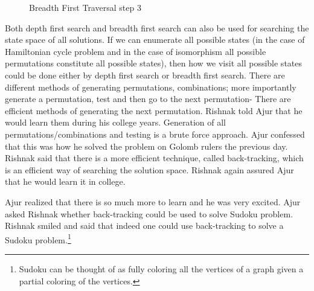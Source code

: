 \begin{figure}
\begin{center}
\caption{ Breadth First Traversal step 3}\label{20g10}
\end{center}
\end{figure}

Both depth first search and breadth first search can also be used for searching the state space of all solutions. If we can enumerate all possible states (in the case of Hamiltonian cycle problem and in the case of isomorphism all possible permutations constitute all possible states), then how we visit all possible states could be done either by depth first search or breadth first search.
There are different methods of generating permutations, combinations; more importantly generate a permutation, test and then go to the next permutation- There are efficient methods of generating the next permutation. Rishnak told Ajur that he would learn them during his college years.
Generation of all permutations/combinations and testing is a brute force approach. Ajur confessed that this was how he solved the problem on Golomb rulers the previous day. Rishnak said that there is a more efficient technique, called back-tracking, which is an efficient way of searching the solution space. Rishnak again assured Ajur that he would learn it in college.

Ajur realized that there is so much more to learn and he was very excited. Ajur asked Rishnak whether back-tracking could be used to solve Sudoku problem. Rishnak smiled and said that indeed one could use back-tracking to solve a Sudoku problem.\footnote{Sudoku can be thought of as fully coloring all the vertices of a graph given a partial coloring of the vertices.}

